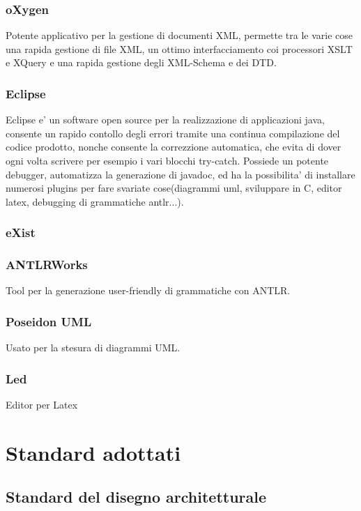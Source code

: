 \documentclass[11pt,titlepage,a4paper,twoside,openany]{book}
\begin{document}
\subsubsection{oXygen}
Potente applicativo per la gestione di documenti XML, permette tra le varie cose una rapida gestione di file XML, un ottimo interfacciamento coi processori XSLT e XQuery e una rapida gestione degli XML-Schema e dei DTD.

\subsubsection{Eclipse}
Eclipse e' un software open source per la realizzazione di applicazioni java, consente un rapido contollo degli errori tramite una continua compilazione del codice prodotto, nonche consente la correzzione automatica, che evita di dover ogni volta scrivere per esempio i vari blocchi try-catch. Possiede un potente debugger, automatizza la generazione di javadoc, ed ha la possibilita' di installare numerosi plugins per fare svariate cose(diagrammi uml, sviluppare in C, editor latex, debugging di grammatiche antlr...).

\subsubsection{eXist}

\subsubsection{ANTLRWorks}Tool per la generazione user-friendly di grammatiche con ANTLR.

\subsubsection{Poseidon UML} Usato per la stesura di diagrammi UML.

\subsubsection{Led}Editor per Latex

\section{Standard adottati}

\subsection{Standard del disegno architetturale}
\end{document}
